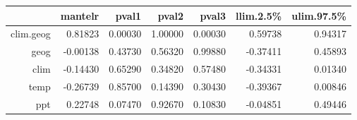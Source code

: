 \begin{table}[ht]
\centering
\begin{tabular}{rrrrrrr}
  \hline
 & mantelr & pval1 & pval2 & pval3 & llim.2.5\% & ulim.97.5\% \\ 
  \hline
clim.geog & 0.81823 & 0.00030 & 1.00000 & 0.00030 & 0.59738 & 0.94317 \\ 
  geog & -0.00138 & 0.43730 & 0.56320 & 0.99880 & -0.37411 & 0.45893 \\ 
  clim & -0.14430 & 0.65290 & 0.34820 & 0.57480 & -0.34331 & 0.01340 \\ 
  temp & -0.26739 & 0.85700 & 0.14390 & 0.30430 & -0.39367 & 0.00846 \\ 
  ppt & 0.22748 & 0.07470 & 0.92670 & 0.10830 & -0.04851 & 0.49446 \\ 
   \hline
\end{tabular}
\end{table}
